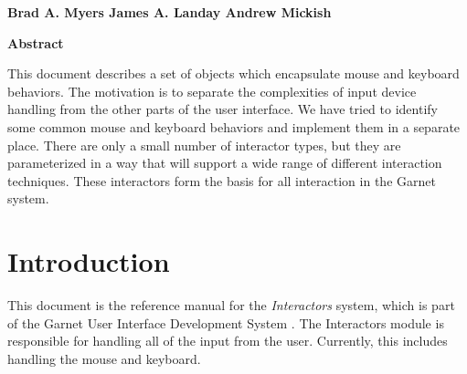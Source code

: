

\begin{titlepage}
\begin{titlebox}
\vspace{0.6 inch}


{\bf Brad A. Myers
James A. Landay
Andrew Mickish}
\vspace{0.3 line}
\value{date}
\end{titlebox}
\vspace{0.5 inch}
\begin{center}
{\bf Abstract}\end{center}
\begin{text}
This document describes a set of objects which encapsulate mouse and
keyboard behaviors.  The motivation is to separate the complexities of
input device handling from the other parts of the user interface.  We have
tried to identify some common mouse and keyboard behaviors and implement them in a
separate place.  There are only a small number of interactor types, but
they are parameterized in a way that will support a wide range of different
interaction techniques.  These interactors form the basis for all
interaction in the Garnet system.

\vspace{0.5 inch}

\end{text}
\end{titlepage}




\chapter{Introduction}

This document is the reference manual for the {\it Interactors} system,
which is part of the Garnet User Interface Development System
\cite{GarnetCHI}.
The Interactors module is responsible for handling all of the input
from the user.  Currently, this includes handling the mouse and
keyboard.

